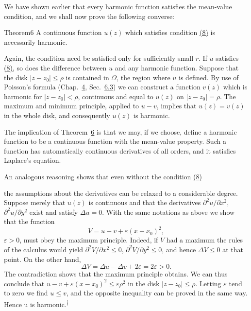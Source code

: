 We have shown earlier that every harmonic function satisfies the mean-value condition, and we shall now prove the following converse:

\begin{originalstatement}{Theorem}{6}\label{thm:6.6}
A continuous function $u(z)$ which satisfies condition \hyperref[eq:6.8]{(8)} is necessarily harmonic.
\end{originalstatement}
Again, the condition need be satisfied only for sufficiently small $r$. If $u$ satisfies \hyperref[eq:6.8]{(8)}, so does the difference between $u$ and any harmonic function. Suppose that the disk $|z - z_0| \leq \rho$ is contained in $\Omega$, the region where $u$ is defined. By use of Poisson's formula (Chap.~\hyperref[chap:4]{4}, Sec.~\hyperref[sec:4.6.3]{6.3}) we can construct a function $v(z)$ which is harmonic for $|z - z_0| < \rho$, continuous and equal to $u(z)$ on $|z - z_0| = \rho$. The maximum and minimum principle, applied to $u - v$, implies that $u(z) = v(z)$ in the whole disk, and consequently $u(z)$ is harmonic.

The implication of Theorem~\hyperref[thm:6.6]{6} is that we may, if we choose, define a harmonic function to be a continuous function with the mean-value property. Such a function has automatically continuous derivatives of all orders, and it satisfies Laplace's equation.

An analogous reasoning shows that even without the condition \hyperref[eq:6.8]{(8)}


the assumptions about the derivatives can be relaxed to a considerable degree. Suppose merely that $u(z)$ is continuous and that the derivatives $\partial^{2}u/\partial x^{2}$, $\partial^{2}u/\partial y^{2}$ exist and satisfy $\Delta u = 0$. With the same notations as above we show that the function
\begin{equation*}
V = u - v + \varepsilon (x - x _ {0}) ^ {2},
\end{equation*}
$\varepsilon > 0$, must obey the maximum principle. Indeed, if $V$ had a maximum the rules of the calculus would yield $\partial^{2}V/\partial x^{2} \leq 0$, $\partial^{2}V/\partial y^{2} \leq 0$, and hence $\Delta V \leq 0$ at that point. On the other hand,
\begin{equation*}
\Delta V = \Delta u - \Delta v + 2 \varepsilon = 2 \varepsilon > 0.
\end{equation*}
The contradiction shows that the maximum principle obtains. We can thus conclude that $u - v + \varepsilon(x - x_{0})^{2} \leq \varepsilon\rho^{2}$ in the disk $|z - z_{0}| \leq \rho$. Letting $\varepsilon$ tend to zero we find $u \leq v$, and the opposite inequality can be proved in the same way. Hence u is harmonic.\hyperlink{fn:259:dagger}{\textsuperscript{\ensuremath{\dagger}}}

